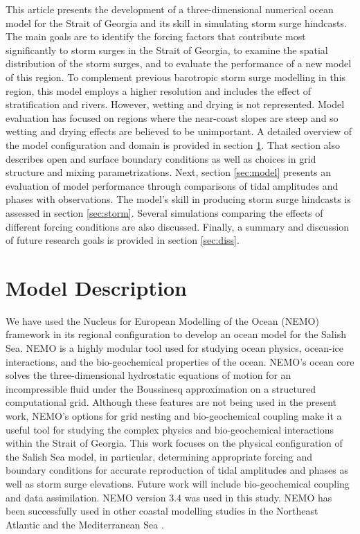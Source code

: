 \documentclass[letterpaper]{tATO2e}
\begin{document}
This article presents the development of a three-dimensional numerical ocean model for the Strait of Georgia and its skill in simulating storm surge hindcasts. {\color{red} The main goals are to identify the forcing factors that contribute most significantly to storm surges in the Strait of Georgia, to examine the spatial distribution of the storm surges, and to evaluate the performance of a new model of this region.}  To complement previous barotropic storm surge modelling in this region, this model employs a higher resolution and includes the effect of stratification and rivers. However, wetting and drying is not represented. Model evaluation has focused on regions where the near-coast slopes are steep and so wetting and drying effects are believed to be unimportant. A detailed overview of the model configuration and domain is provided in section \ref{sec:config}. That section also describes open and surface boundary conditions as well as choices in grid structure and mixing parametrizations. Next, section \ref{sec:model} presents an evaluation of model performance through comparisons of tidal amplitudes and phases with observations. The model's skill in producing storm surge hindcasts is assessed in section \ref{sec:storm}. Several simulations comparing the effects of different forcing conditions are also discussed. Finally, a summary and discussion of future research goals is provided in section \ref{sec:diss}.  

\section{Model Description}\label{sec:config}

We have used the Nucleus for European Modelling of the Ocean (NEMO) framework in its regional configuration \citep{madec2012nemo} to develop an ocean model for the Salish Sea. NEMO is a highly modular tool used for studying ocean physics, ocean-ice interactions, and the bio-geochemical properties of the ocean. NEMO's ocean core solves the three-dimensional hydrostatic equations of motion for an incompressible fluid under the Boussinesq approximation on a structured computational grid. {\color{red} Although these features are not being used in the present work, NEMO's options for grid nesting and bio-geochemical coupling make it a useful tool for studying the complex physics and bio-geochemical interactions within the Strait of Georgia.} This work focuses on the physical configuration of the Salish Sea model, in particular, determining appropriate forcing and boundary conditions for accurate reproduction of tidal amplitudes and phases as well as storm surge elevations. Future work will include bio-geochemical coupling and data assimilation. NEMO version 3.4 was used in this study. {\color{red} NEMO has been successfully used in other coastal modelling studies in the Northeast Atlantic \citep{maraldi2013nemo} and the Mediterranean Sea \citep{brossier2012sensitivity}.} 
\end{document}
